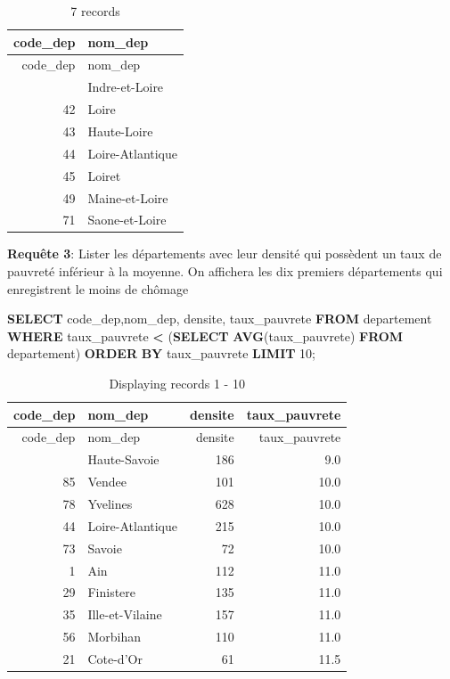 \documentclass[mstat,12pt]{unswthesis}
\newenvironment{Shaded}{\begin{snugshade}}{\end{snugshade}}
\newcommand{\DecValTok}[1]{\textcolor[rgb]{0.00,0.00,0.81}{#1}}
\newcommand{\FunctionTok}[1]{\textcolor[rgb]{0.13,0.29,0.53}{\textbf{#1}}}
\newcommand{\KeywordTok}[1]{\textcolor[rgb]{0.13,0.29,0.53}{\textbf{#1}}}
\newcommand{\NormalTok}[1]{#1}
\newcommand{\OperatorTok}[1]{\textcolor[rgb]{0.81,0.36,0.00}{\textbf{#1}}}
\begin{document}
\begin{longtable}[]{@{}rl@{}}
\caption{7 records}\tabularnewline
\toprule\noalign{}
code\_dep & nom\_dep \\
\midrule\noalign{}
\endfirsthead
\toprule\noalign{}
code\_dep & nom\_dep \\
\midrule\noalign{}
\endhead
\bottomrule\noalign{}
\endlastfoot
37 & Indre-et-Loire \\
42 & Loire \\
43 & Haute-Loire \\
44 & Loire-Atlantique \\
45 & Loiret \\
49 & Maine-et-Loire \\
71 & Saone-et-Loire \\
\end{longtable}

\medskip

\textbf{Requête 3}: Lister les départements avec leur densité qui
possèdent un taux de pauvreté inférieur à la moyenne. On affichera les
dix premiers départements qui enregistrent le moins de chômage

\begin{Shaded}
\begin{Highlighting}[]
\KeywordTok{SELECT}\NormalTok{ code\_dep,nom\_dep, densite, taux\_pauvrete}
\KeywordTok{FROM}\NormalTok{ departement}
\KeywordTok{WHERE}\NormalTok{ taux\_pauvrete }\OperatorTok{\textless{}}\NormalTok{ (}\KeywordTok{SELECT} \FunctionTok{AVG}\NormalTok{(taux\_pauvrete) }\KeywordTok{FROM}\NormalTok{ departement)}
\KeywordTok{ORDER} \KeywordTok{BY}\NormalTok{ taux\_pauvrete }
\KeywordTok{LIMIT} \DecValTok{10}\NormalTok{;}
\end{Highlighting}
\end{Shaded}

\begin{longtable}[]{@{}rlrr@{}}
\caption{Displaying records 1 - 10}\tabularnewline
\toprule\noalign{}
code\_dep & nom\_dep & densite & taux\_pauvrete \\
\midrule\noalign{}
\endfirsthead
\toprule\noalign{}
code\_dep & nom\_dep & densite & taux\_pauvrete \\
\midrule\noalign{}
\endhead
\bottomrule\noalign{}
\endlastfoot
74 & Haute-Savoie & 186 & 9.0 \\
85 & Vendee & 101 & 10.0 \\
78 & Yvelines & 628 & 10.0 \\
44 & Loire-Atlantique & 215 & 10.0 \\
73 & Savoie & 72 & 10.0 \\
1 & Ain & 112 & 11.0 \\
29 & Finistere & 135 & 11.0 \\
35 & Ille-et-Vilaine & 157 & 11.0 \\
56 & Morbihan & 110 & 11.0 \\
21 & Cote-d'Or & 61 & 11.5 \\
\end{longtable}
\end{document}
